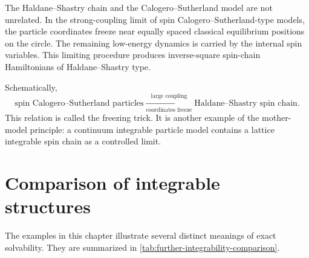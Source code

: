 The Haldane--Shastry chain and the Calogero--Sutherland model are not unrelated.
In the strong-coupling limit of spin Calogero--Sutherland-type models, the
particle coordinates freeze near equally spaced classical equilibrium positions
on the circle.  The remaining low-energy dynamics is carried by the internal
spin variables.  This limiting procedure produces inverse-square spin-chain
Hamiltonians of Haldane--Shastry type.

Schematically,
\begin{equation}
\label{eq:further-freezing-trick-schematic}
    \text{spin Calogero--Sutherland particles}
    \xrightarrow[\text{coordinates freeze}]{\text{large coupling}}
    \text{Haldane--Shastry spin chain}.
\end{equation}
This relation is called the freezing trick.  It is another example of the
mother-model principle: a continuum integrable particle model contains a lattice
integrable spin chain as a controlled limit.

\section{Comparison of integrable structures}
\label{sec:further-comparison-integrable-structures}

The examples in this chapter illustrate several distinct meanings of exact
solvability.  They are summarized in \cref{tab:further-integrability-comparison}.

